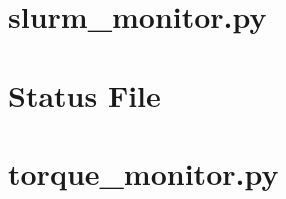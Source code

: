 \newpage

\section{slurm\_monitor.py}
\label{append:slurmcode}



\newpage

\section{Status File}
\label{append:status}



\newpage

\section{torque\_monitor.py}
\label{append:torquecode}

